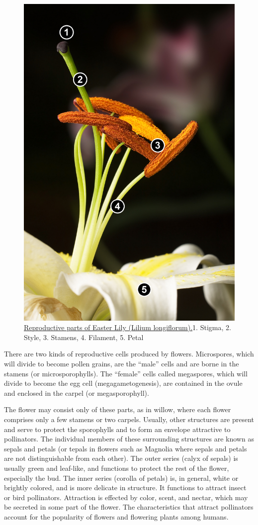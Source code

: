 \begin{figure}

{\centering \includegraphics[width=0.7\linewidth]{./figures/plants/Lillium_Stamens} 

}

\caption{\href{https://commons.wikimedia.org/wiki/File:Lillium_Stamens.jpg}{Reproductive parts of Easter Lily (Lilium longiflorum).}1. Stigma, 2. Style, 3. Stamens, 4. Filament, 5. Petal}\label{fig:lilistamen}
\end{figure}

There are two kinds of reproductive cells produced by flowers. Microspores, which will divide to become pollen grains, are the ``male'' cells and are borne in the stamens (or microsporophylls). The ``female'' cells called megaspores, which will divide to become the egg cell (megagametogenesis), are contained in the ovule and enclosed in the carpel (or megasporophyll).

The flower may consist only of these parts, as in willow, where each flower comprises only a few stamens or two carpels. Usually, other structures are present and serve to protect the sporophylls and to form an envelope attractive to pollinators. The individual members of these surrounding structures are known as sepals and petals (or tepals in flowers such as Magnolia where sepals and petals are not distinguishable from each other). The outer series (calyx of sepals) is usually green and leaf-like, and functions to protect the rest of the flower, especially the bud. The inner series (corolla of petals) is, in general, white or brightly colored, and is more delicate in structure. It functions to attract insect or bird pollinators. Attraction is effected by color, scent, and nectar, which may be secreted in some part of the flower. The characteristics that attract pollinators account for the popularity of flowers and flowering plants among humans.

